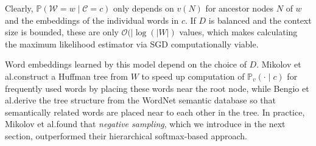 \documentclass{amsart}
\theoremstyle{plain}
\theoremstyle{definition}
\renewcommand{\P}{\mathbb{P}}
\begin{document}
Clearly, $\P(\mathcal{W} = w \mid \mathcal{C} = c)$ only depends on $v(N)$ for ancestor nodes $N$ of $w$ and the embeddings of the individual words in $c$.
If $D$ is balanced and the context size is bounded, these are only $\mathcal{O}(|\log(|W|)$ values, which makes calculating the maximum likelihood estimator via SGD computationally viable.

Word embeddings learned by this model depend on the choice of $D$.
Mikolov et al.\@ construct a Huffman tree from $W$ to speed up computation of $\P_v(\cdot \mid c)$ for frequently used words by placing these words near the root node, while Bengio et al.\@ derive the tree structure from the WordNet \cite{asdfasdfasdf} semantic database so that semantically related words are placed near to each other in the tree.
In practice, Mikolov et al.\@ found that \emph{negative sampling}, which we introduce in the next section, outperformed their hierarchical softmax-based approach.
\end{document}
